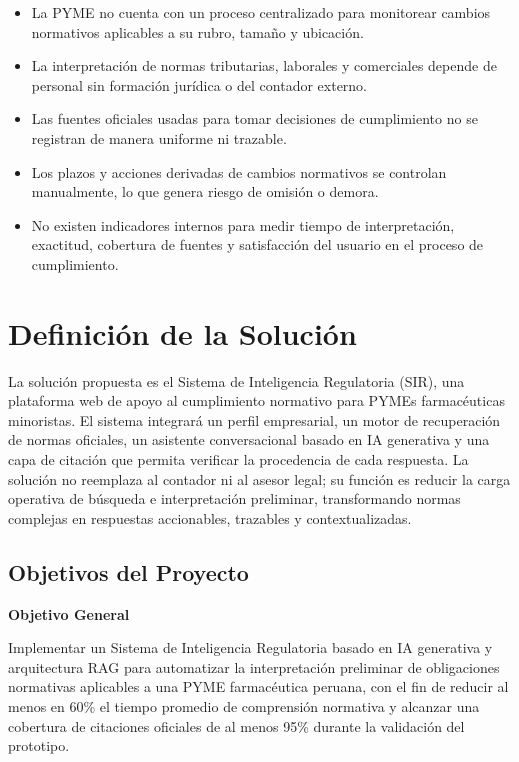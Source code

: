 \documentclass[12pt,a4paper,oneside]{report}
\begin{document}
\begin{itemize}
\item La PYME no cuenta con un proceso centralizado para monitorear cambios normativos aplicables a su rubro, tamaño y ubicación.
\item La interpretación de normas tributarias, laborales y comerciales depende de personal sin formación jurídica o del contador externo.
\item Las fuentes oficiales usadas para tomar decisiones de cumplimiento no se registran de manera uniforme ni trazable.
\item Los plazos y acciones derivadas de cambios normativos se controlan manualmente, lo que genera riesgo de omisión o demora.
\item No existen indicadores internos para medir tiempo de interpretación, exactitud, cobertura de fuentes y satisfacción del usuario en el proceso de cumplimiento.
\end{itemize}

\section{Definición de la Solución}\label{sec:definicion-de-la-solucion}

La solución propuesta es el Sistema de Inteligencia Regulatoria (SIR), una plataforma web de apoyo al cumplimiento normativo para PYMEs farmacéuticas minoristas. El sistema integrará un perfil empresarial, un motor de recuperación de normas oficiales, un asistente conversacional basado en IA generativa y una capa de citación que permita verificar la procedencia de cada respuesta. La solución no reemplaza al contador ni al asesor legal; su función es reducir la carga operativa de búsqueda e interpretación preliminar, transformando normas complejas en respuestas accionables, trazables y contextualizadas.

\subsection{Objetivos del Proyecto}\label{subsec:objetivos-del-proyecto}

\textbf{Objetivo General}

Implementar un Sistema de Inteligencia Regulatoria basado en IA generativa y arquitectura RAG para automatizar la interpretación preliminar de obligaciones normativas aplicables a una PYME farmacéutica peruana, con el fin de reducir al menos en 60\% el tiempo promedio de comprensión normativa y alcanzar una cobertura de citaciones oficiales de al menos 95\% durante la validación del prototipo.
\end{document}
